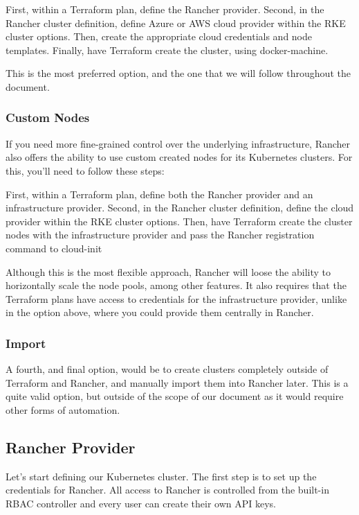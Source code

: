 First, within a  Terraform plan, define the Rancher provider. Second, in the Rancher cluster definition, define Azure or AWS cloud provider within the RKE cluster options. Then, create the appropriate cloud credentials and node templates. Finally, have Terraform create the cluster, using docker-machine.

This is the most preferred option, and the one that we will follow throughout the document.

\subsubsection{Custom Nodes}

If you need more fine-grained control over the underlying infrastructure, Rancher also offers the ability to use custom created nodes for its Kubernetes clusters. For this, you'll need to follow these steps:

First, within a  Terraform plan, define both the Rancher provider and an infrastructure provider. Second, in the Rancher cluster definition, define the cloud provider within the RKE cluster options. Then, have Terraform create the cluster nodes with the infrastructure provider and pass the Rancher registration command to cloud-init

Although this is the most flexible approach, Rancher will loose the ability to horizontally scale the node pools, among other features. It also requires that the Terraform plans have access to credentials for the infrastructure provider, unlike in the option above, where you could provide them centrally in Rancher.

\subsubsection{Import}

A fourth, and final option, would be to create clusters completely outside of Terraform and Rancher, and manually import them into Rancher later. This is a quite valid option, but outside of the scope of our document as it would require other forms of automation.

\subsection{Rancher Provider}

Let's start defining our Kubernetes cluster. The first step is to set up the credentials for Rancher. All access to Rancher is controlled from the built-in RBAC controller and every user can create their own API keys.

